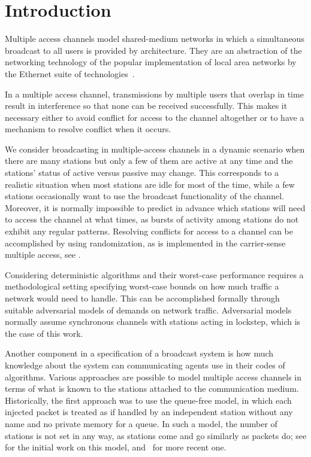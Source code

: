 \documentclass[11pt]{article}
\begin{document}
\thispagestyle{empty}
\setcounter{page}{0}



\newpage



\section{Introduction}

\label{sec:introduction}



Multiple access channels model shared-medium networks in which a simultaneous broadcast to all users is provided by architecture. 
They are an abstraction of the networking technology of the popular implementation of local area networks by the Ethernet suite of technologies~\cite{MetcalfeB-CACM76}.

In a multiple access channel, transmissions by multiple users that overlap in time result in interference so that none can be  received successfully.
This makes it necessary either to avoid  conflict for access to the channel altogether or to have a mechanism to resolve conflict when it occurs.

We consider broadcasting in multiple-access channels in a dynamic scenario when there are many stations but only a few of them are active at any time and the stations' status of active versus passive may change. 
This corresponds to a realistic situation when most stations are idle for most of the time, while a few stations occasionally want to use the broadcast functionality of the channel.
Moreover, it is normally impossible to predict in advance which stations will need to access the channel at what times, as bursts of activity among stations do not exhibit any regular patterns.
Resolving conflicts for access to a channel can be accomplished by using randomization, as is implemented in the carrier-sense multiple access, see \cite{Keshav-book97}.

Considering deterministic algorithms and their worst-case performance requires a  methodological setting specifying worst-case bounds on how much traffic a network would need to handle.
This can be accomplished formally through suitable adversarial models of  demands on network traffic.
Adversarial models normally assume synchronous channels with stations acting in lockstep, which is the case of this work.

Another component in a specification of a broadcast system is how much knowledge about the  system can communicating agents use in their codes of algorithms.
Various approaches are possible to model multiple access channels in terms of what is known to the stations attached to the communication medium.
Historically, the first approach was to use the queue-free model, in which each injected packet is treated as if handled by an independent station without any name and no private memory for a queue.
In such a model, the number of stations is not set in any way, as stations come and go similarly as packets do; see \cite{Gallager-TIT85} for the initial work on this model, and~\cite{BenderFHKL05} for more recent one.
\end{document}
